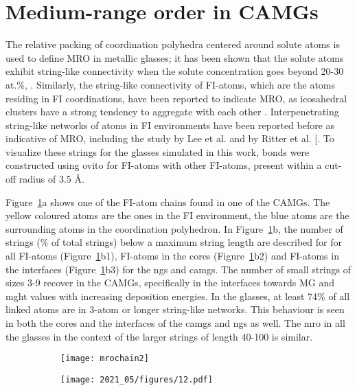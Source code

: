 \section{Medium-range order in CAMGs}

\begin{selfcite}
The relative packing of coordination polyhedra centered around solute atoms is used to define MRO in metallic glasses; it has been shown that the solute atoms exhibit string-like connectivity when the solute concentration goes beyond 20-30 at.\%, \cite{Sheng2006}. Similarly, the string-like connectivity of FI-atoms, which are the atoms residing in FI coordinations, have been reported to indicate MRO, as icosahedral  clusters have a strong tendency to aggregate with each other \cite{Bernal1959,Miracle2004,Li2008}. Interpenetrating string-like networks of atoms in FI environments have been reported before as indicative of MRO, including the study by Lee et al. \cite{Lee2011} and by Ritter et al. [\cite{Ritter2011}. To visualize these strings for the glasses simulated in this work, bonds were constructed  using \gls{ovito} for FI-atoms with other FI-atoms, present within a cut-off radius of 3.5 \r{A}. \par 
\end{selfcite}

Figure~\ref{f:mro-alt_camg}a shows one of the FI-atom chains found in one of the CAMGs. The yellow coloured atoms are the ones in the FI environment, the blue atoms are the surrounding atoms in the coordination polyhedron. In Figure~\ref{f:mro-alt_camg}b, the number of strings (\% of total strings) below a maximum string length are described for for all FI-atoms (Figure~\ref{f:mro-alt_camg}b1), FI-atoms in the cores (Figure~\ref{f:mro-alt_camg}b2) and FI-atoms in the interfaces (Figure~\ref{f:mro-alt_camg}b3) for the \gls{ng}s and \gls{camg}s. The number of small strings of sizes 3-9 recover in the CAMGs, specifically in the interfaces towards MG and \gls{mght} values with increasing deposition energies. In the glasses, at least 74\% of all linked atoms are in 3-atom or longer string-like networks. This behaviour is seen in both the cores and the interfaces of the \gls{camg}s and \gls{ng}s as well. The \gls{mro} in all the glasses in the context of the larger strings of length 40-100 is similar. \par

\begin{figure} %
	\centering
	\begin{subfigure}[b]{0.5\textwidth} \centering
	\texttt{[image: mrochain2]}	\subcaption{}
	\end{subfigure}%
	\vfill
	\begin{subfigure}{\textwidth} \centering
		\texttt{[image: 2021\_05/figures/12.pdf]}	\subcaption{}
	\end{subfigure}%
	\label{f:mro-alt_camg}
\end{figure}

